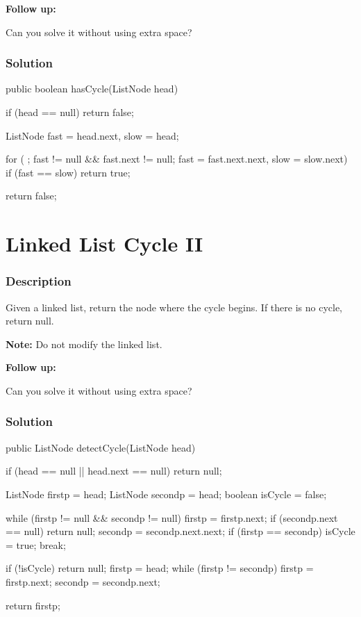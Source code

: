 \textbf{Follow up:}

Can you solve it without using extra space?

\subsubsection{Solution}

\begin{Code}
public boolean hasCycle(ListNode head) {
    if (head == null) {
        return false;
    }

    ListNode fast = head.next, slow = head;

    for ( ; fast != null && fast.next != null; fast = fast.next.next, slow = slow.next) {
        if (fast == slow) {
            return true;
        }
    }

    return false;
}
\end{Code}

\newpage

\section{Linked List Cycle II} %

\subsubsection{Description}
Given a linked list, return the node where the cycle begins. If there is no cycle, return null.

\textbf{Note:} Do not modify the linked list.

\textbf{Follow up:}

Can you solve it without using extra space?

\subsubsection{Solution}

\begin{Code}
public ListNode detectCycle(ListNode head) {
    if (head == null || head.next == null) return null;

    ListNode firstp = head;
    ListNode secondp = head;
    boolean isCycle = false;

    while (firstp != null && secondp != null) {
        firstp = firstp.next;
        if (secondp.next == null) return null;
        secondp = secondp.next.next;
        if (firstp == secondp) {
            isCycle = true;
            break;
        }
    }

    if (!isCycle) return null;
    firstp = head;
    while (firstp != secondp) {
        firstp = firstp.next;
        secondp = secondp.next;
    }

    return firstp;
}
\end{Code}

